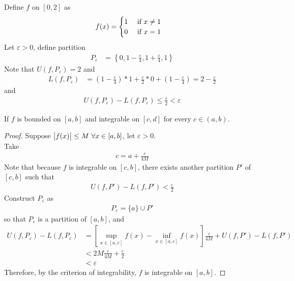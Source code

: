 \documentclass[11pt]{article}
\begin{document}
	\begin{example}
		Define $f$ on $[0, 2]$ as
		\begin{align}
			f(x) &= \begin{cases}
				1 &\text{{ if }} x \neq 1 \\
				0 &\text{{ if }} x = 1
			\end{cases}
		\end{align}
		Let $\varepsilon > 0$, define partition
		\begin{align}
			P_\varepsilon &= \left \{0, 1 - \frac{\varepsilon}{4}, 1 + \frac{\varepsilon}{4}, 1 \right \}
		\end{align}
		Note that $U(f, P_\varepsilon) = 2$ and 
		\begin{align}
			L(f, P_\varepsilon) &= \left(1 - \frac{\varepsilon}{4} \right) * 1 + \frac{\varepsilon}{2} * 0 + \left(1 - \frac{\varepsilon}{4} \right) = 2 - \frac{\varepsilon}{2}
		\end{align}
		and 
		\begin{align}
			U(f, P_\varepsilon) - L(f, P_\varepsilon) \leq \frac{\varepsilon}{2} < \varepsilon
		\end{align}
	\end{example}
	
	\begin{theorem}
		If $f$ is bounded on $[a, b]$ and integrable on $[c, d]$ for every $c \in (a, b)$.
	\end{theorem}
	
	\begin{proof}
		Suppose $\abs{f(x)} \leq M\ \forall x \in [a, b]$, let $\varepsilon > 0$. \\
		Take
		\begin{align}
			c = a + \frac{\varepsilon}{4M}
		\end{align}
		Note that because $f$ is integrable on $[c, b]$, there exists another partition $P'$ of $[c, b]$ such that
		\begin{align}
			U(f, P') - L(f, P') < \frac{\varepsilon}{2} 
		\end{align}
		Construct $P_\varepsilon$ as
		\begin{align}
			P_\varepsilon = \{a\} \cup P'
		\end{align}
		so that $P_\varepsilon$ is a partition of $[a, b]$, and
		\begin{align}
			U(f, P_\varepsilon) - L(f, P_\varepsilon) &= \left[\sup_{x \in [a, c]} f(x) - \inf_{x \in [a, c]} f(x) \right] \frac{\varepsilon}{4M} + U(f, P') - L(f, P') \\
			&< 2M \frac{\varepsilon}{4M} + \frac{\varepsilon}{2} \\
			&< \varepsilon
		\end{align}
		Therefore, by the criterion of integrability, $f$ is integrable on $[a, b]$.
	\end{proof}
	
\end{document}
